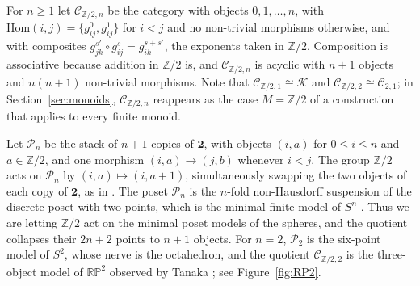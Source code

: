 \documentclass[12pt]{amsart}
\theoremstyle{definition}
\theoremstyle{remark}
\newcommand{\CC}{\mathcal{C}}
\newcommand{\PP}{\mathcal{P}}
\newcommand{\Hom}{\mathrm{Hom}}
\newcommand{\Z}{\mathbb{Z}}
\newcommand{\K}{\mathcal{K}}
\newcommand{\RP}{\mathbb{RP}}
\begin{document}
For $n\ge1$ let $\CC_{\Z/2,n}$ be the category with objects $0,1,\dots,n$, with $\Hom(i,j)=\{g_{ij}^0,g_{ij}^1\}$ for $i<j$ and no non-trivial morphisms otherwise, and with composites $g_{jk}^{s'}\circ g_{ij}^s=g_{ik}^{s+s'}$, the exponents taken in $\Z/2$. Composition is associative because addition in $\Z/2$ is, and $\CC_{\Z/2,n}$ is acyclic with $n+1$ objects and $n(n+1)$ non-trivial morphisms. Note that $\CC_{\Z/2,1}\cong\K$ and $\CC_{\Z/2,2}\cong\CC_{2,1}$; in Section~\ref{sec:monoids}, $\CC_{\Z/2,n}$ reappears as the case $M=\Z/2$ of a construction that applies to every finite monoid.

Let $\PP_n$ be the stack of $n+1$ copies of $\mathbf 2$, with objects $(i,a)$ for $0\le i\le n$ and $a\in\Z/2$, and one morphism $(i,a)\to(j,b)$ whenever $i<j$. The group $\Z/2$ acts on $\PP_n$ by $(i,a)\mapsto(i,a+1)$, simultaneously swapping the two objects of each copy of $\mathbf 2$, as in \cite[Example~14.6]{Kozlov2008}. The poset $\PP_n$ is the $n$-fold non-Hausdorff suspension of the discrete poset with two points, which is the minimal finite model of $S^n$ \cite{BarmakMinian2007}. Thus we are letting $\Z/2$ act on the minimal poset models of the spheres, and the quotient collapses their $2n+2$ points to $n+1$ objects. For $n=2$, $\PP_2$ is the six-point model of $S^2$, whose nerve is the octahedron, and the quotient $\CC_{\Z/2,2}$ is the three-object model of $\RP^2$ observed by Tanaka \cite[Example~3.8]{Tanaka2018LS}; see Figure~\ref{fig:RP2}.
\end{document}
